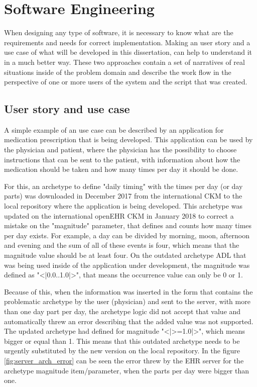 \documentclass[mim_thesis.tex]{subfiles}
\begin{document}
\section{Software Engineering}
When designing any type of software, it is necessary to know what are the requirements and needs for correct implementation. Making an user story and a use case of what will be developed in this dissertation, can help to understand it in a much better way. These two approaches contain a set of narratives of real situations inside of the problem domain and describe the work flow in the perspective of one or more users of the system and the script that was created.  

\subsection{User story and use case}

A simple example of an use case can be described by an application for medication prescription that is being developed. This application can be used by the physician and patient, where the physician has the possibility to choose instructions that can be sent to the patient, with information about how the medication should be taken and how many times per day it should be done. 

For this, an archetype to define "daily timing" with the times per day (or day parts) was downloaded in December 2017 from the international CKM to the local repository where the application is being developed. This archetype was updated on the international openEHR CKM in January 2018 to correct a mistake on the "magnitude" parameter, that defines and counts how many times per day exists. For example, a day can be divided by morning, moon, afternoon and evening and the sum of all of these events is four, which means that the magnitude value should be at least four. On the outdated archetype ADL that was being used inside of the application under development, the magnitude was defined as "<|0.0..1.0|>", that means the occurrence value can only be 0 or 1. 

Because of this, when the information was inserted in the form that contains the problematic archetype by the user (physician) and sent to the server, with more than one day part per day, the archetype logic did not accept that value and automatically threw an error describing that the added value was not supported. The updated archetype had defined for magnitude "<|>=1.0|>", which means bigger or equal than 1. This means that this outdated archetype needs to be urgently substituted by the new version on the local repository. In the figure \ref{fig:server_arch_error} can be seen the error threw by the EHR server for the archetype magnitude item/parameter, when the parts per day were bigger than one.
\end{document}
